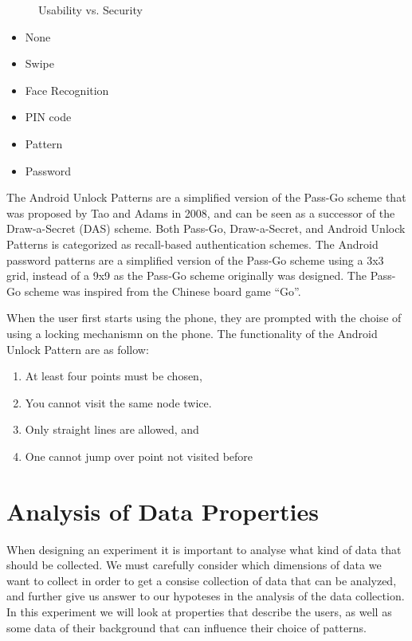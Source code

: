 \begin{figure}
\begin{center}
      \end{center}
      \vspace{-5pt}
      \caption{Usability vs. Security}
      \vspace{-10pt}
    \end{figure}
    
      \begin{itemize}
        \item None
        \item Swipe
        \item Face Recognition
        \item PIN code
        \item Pattern
        \item Password
      \end{itemize}
    
    The Android Unlock Patterns are a simplified version of the Pass-Go scheme that was proposed by Tao and Adams in 2008, and can be seen as a successor of the Draw-a-Secret (DAS) scheme. Both Pass-Go, Draw-a-Secret, and Android Unlock Patterns is categorized as recall-based authentication schemes.
    The Android password patterns are a simplified version of the Pass-Go scheme using a 3x3 grid, instead of a 9x9 as the Pass-Go scheme originally was designed. The Pass-Go scheme was inspired from the Chinese board game ``Go''.

    When the user first starts using the phone, they are prompted with the choise of using a locking mechanismn on the phone. The functionality of the Android Unlock Pattern are as follow: 
      \begin{enumerate}
        \item At least four points must be chosen,
        \item You cannot visit the same node twice.
        \item Only straight lines are allowed, and
        \item One cannot jump over point not visited before
      \end{enumerate}
  
  \clearpage
  \section{Analysis of Data Properties}

  When designing an experiment it is important to analyse what kind of data that should be collected. We must carefully consider which dimensions of data we want to collect in order to get a consise collection of data that can be analyzed, and further give us answer to our hypoteses in the analysis of the data collection. In this experiment we will look at properties that describe the users, as well as some data of their background that can influence their choice of patterns. 

